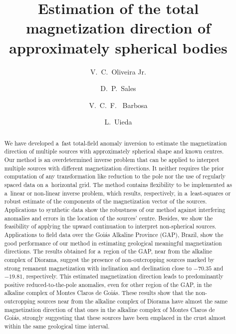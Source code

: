 \documentclass[journal abbreviation, npg]{copernicus}
\begin{document}
\linenumbers

\title{Estimation of the total magnetization direction of approximately spherical bodies}

\author[1]{V.~C.~Oliveira Jr.}
\author[1]{D.~P.~Sales}
\author[1]{V.~C.~F. ~Barbosa}
\author[1, 2]{L.~Uieda}





\published{}



\maketitle  %

\begin{abstract}
  We have developed a~fast total-field anomaly inversion to estimate
  the magnetization direction of multiple sources with approximately
  spherical shape and known centres. Our method is an overdetermined
  inverse problem that can be applied to
  interpret multiple sources with different magnetization
  directions. It neither requires the prior computation of any
  transformation like reduction to the pole nor the use of regularly
  spaced data on a~horizontal grid. The method contains flexibility to
  be implemented as a~linear or non-linear inverse problem, which
  results, respectively, in a~least-squares or robust estimate of the
  components of the magnetization vector of the sources. Applications
  to synthetic data show the robustness of our method against
  interfering anomalies and errors in the location of the sources'
  centre. Besides, we show the feasibility of applying the upward
  continuation to interpret non-spherical sources. Applications to
  field data over the Goi\'{a}s Alkaline Province (GAP), Brazil, show
  the good performance of our method in estimating geological
  meaningful magnetization directions. The results obtained for
  a~region of the GAP, near from the alkaline complex of Diorama,
  suggest the presence of non-outcropping sources marked by strong
  remanent magnetization with inclination and declination close to
  $-70.35${\degree} and $-19.81${\degree}, respectively. This
  estimated magnetization direction leads to predominantly positive
  reduced-to-the-pole anomalies, even for other region of the GAP, in
  the alkaline complex of Montes Claros de Goi\'{a}s. These results show 
  that the non-outcropping sources near from the alkaline complex of 
  Diorama have almost the same magnetization direction of that
  ones in the alkaline complex of Montes Claros de Goi\'{a}s, strongly 
  suggesting that these sources have been emplaced in the crust almost 
  within the same geological time interval.
\end{abstract}
\end{document}
